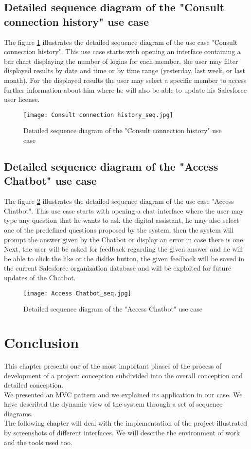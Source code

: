 \subsection{Detailed sequence diagram of the "Consult connection history" use case}
The figure \ref{connection_seq} illustrates the detailed sequence diagram of the use case
"Consult connection history".
This use case starts with opening an interface containing a bar chart displaying the number of logins for each member, the user may filter displayed results by date and time or by time range (yesterday, last week, or last month). For the displayed results the user may select a specific member to access further information about him where he will also be able to update his Salesforce user license.
\begin{figure}[H]%
    \center   
    \texttt{[image: Consult connection history\_seq.jpg]}
    \caption{Detailed sequence diagram of the "Consult connection history" use case}
    \label{connection_seq}
\end{figure}
\subsection{Detailed sequence diagram of the "Access Chatbot" use case}
The figure \ref{chatbot_seq} illustrates the detailed sequence diagram of the use case
"Access Chatbot".
This use case starts with opening a chat interface where the user may type any question that he wants to ask the digital assistant, he may also select one of the predefined questions proposed by the system, then the system will prompt the answer given by the Chatbot or display an error in case there is one. Next, the user will be asked for feedback regarding the given answer and he will be able to click the like or the dislike button, the given feedback will be saved in the current Salesforce organization database and will be exploited for future updates of the Chatbot.
\begin{figure}[H]%
    \center   
    \texttt{[image: Access Chatbot\_seq.jpg]}
    \caption{Detailed sequence diagram of the "Access Chatbot" use case}
    \label{chatbot_seq}
\end{figure}
\section*{Conclusion}
This chapter presents one of the most important phases of the process of
development of a project: conception subdivided into the overall conception
and detailed conception.\\
We presented an MVC pattern and we
explained its application in our case. We have described the dynamic view
of the system through a set of sequence diagrams.\\
The following chapter will deal with the implementation of the project illustrated by screenshots of different interfaces. We will describe the environment of
work and the tools used too.